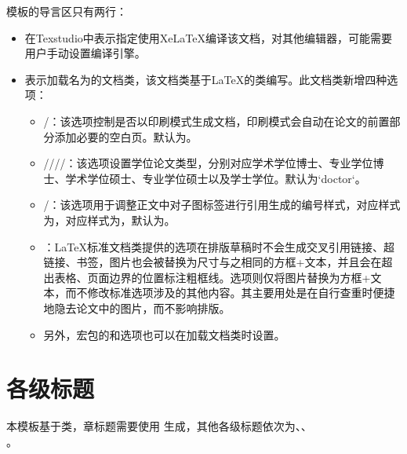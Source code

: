 \documentclass[print, doctor, vlined]{DissertUESTC}
\begin{document}
	模板的导言区只有两行：
	\begin{itemize}
		\item {}在Texstudio中表示指定使用XeLaTeX编译该文档，对其他编辑器，可能需要用户手动设置编译引擎。

		\item {}表示加载名为的文档类，该文档类基于LaTeX的类编写。此文档类新增四种选项：

		\begin{itemize}
			\item {}/：该选项控制是否以印刷模式生成文档，印刷模式会自动在论文的前置部分添加必要的空白页。默认为。

			\item {}////：该选项设置学位论文类型，分别对应学术学位博士、专业学位博士、学术学位硕士、专业学位硕士以及学士学位。默认为`doctor`。
   
			\item {}/：该选项用于调整正文中对子图标签进行引用生成的编号样式，对应样式为，对应样式为，默认为。
   
			\item {}：LaTeX标准文档类提供的选项在排版草稿时不会生成交叉引用链接、超链接、书签，图片也会被替换为尺寸与之相同的方框+文本，并且会在超出表格、页面边界的位置标注粗框线。选项则仅将图片替换为方框+文本，而不修改标准选项涉及的其他内容。其主要用处是在自行查重时便捷地隐去论文中的图片，而不影响排版。

			\item 另外，宏包的和选项也可以在加载文档类时设置。
		\end{itemize}
	\end{itemize}
	
	\section{各级标题}
	
	本模板基于类，章标题需要使用 生成，其他各级标题依次为、、\\ 。
	
\end{document}

